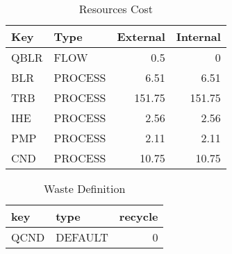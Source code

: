 \begin{table}[H]
\caption{Resources Cost}
\label{tab:ResourcesCost}
	\begin{tabular}{llrr}
		\toprule
		Key    & Type      &    External &    Internal\\
		\midrule
		QBLR   & FLOW      &         0.5 &           0\\
		BLR    & PROCESS   &        6.51 &        6.51\\
		TRB    & PROCESS   &      151.75 &      151.75\\
		IHE    & PROCESS   &        2.56 &        2.56\\
		PMP    & PROCESS   &        2.11 &        2.11\\
		CND    & PROCESS   &       10.75 &       10.75\\
		\bottomrule
	\end{tabular}
\end{table}

\begin{table}[H]
\caption{Waste Definition}
\label{tab:WasteDefinition}
	\begin{tabular}{llr}
		\toprule
		key    & type      &     recycle\\
		\midrule
		QCND   & DEFAULT   &           0\\
		\bottomrule
	\end{tabular}
\end{table}

